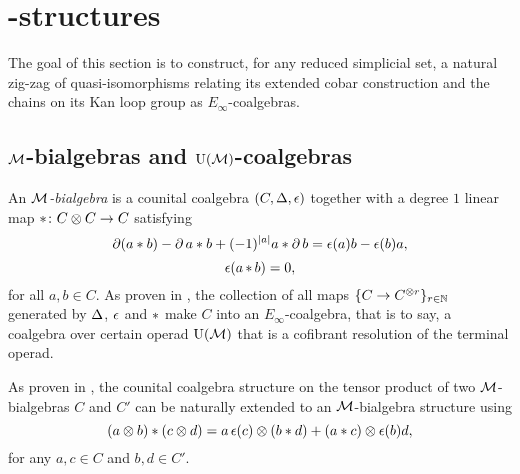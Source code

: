

\section{\pdfEinfty-structures}

The goal of this section is to construct, for any reduced simplicial set, a natural zig-zag of quasi-isomorphisms relating its extended cobar construction and the chains on its Kan loop group as $E_\infty$-coalgebras.

\subsection{$\mathcal{M}$-bialgebras and ${\operatorname{U}(\mathcal{M})}$-coalgebras}\label{ss:e-infty extension}

An \textit{$\mathcal{M}$-bialgebra} is a counital coalgebra $(C, \operatorname{\Delta}, \operatorname{\epsilon})$ together with a degree $1$ linear map $\operatorname{\ast} \colon C \otimes C \to C$ satisfying
\[
\operatorname{\partial} (a \ast b) - \operatorname{\partial} a \ast b + (-1)^{\lvert a\rvert} a \ast \operatorname{\partial} b =
\operatorname{\epsilon}(a) b - \operatorname{\epsilon}(b) a,
\]
\[
\operatorname{\epsilon} (a \operatorname{\ast} b) = 0,
\]
for all $a, b \in C$.
As proven in \cite{medina2020prop1}, the collection of all maps $\{C \to C^{\otimes r}\}_{r \in \mathbb{N}}$ generated by $\operatorname{\Delta}$, $\operatorname{\epsilon}$ and $\operatorname{\ast}$ make $C$ into an $E_\infty$-coalgebra, that is to say, a coalgebra over certain operad ${\operatorname{U}(\mathcal{M})}$ that is a cofibrant resolution of the terminal operad.

As proven in \cite{medina2021cobar}, the counital coalgebra structure on the tensor product of two $\mathcal{M}$-bialgebras $C$ and $C'$ can be naturally extended to an $\mathcal{M}$-bialgebra structure using
\begin{equation}\label{eq:monoidal_product}
	(a \otimes b) \ast (c \otimes d) =
	a \operatorname{\epsilon}(c) \otimes (b \ast d) + (a \ast c) \otimes \operatorname{\epsilon}(b) d,
\end{equation}
for any $a,c \in C$ and $b,d \in C'$.

